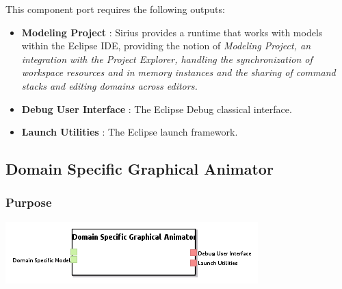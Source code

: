 \documentclass{gemoc} %
\begin{document}
This component port requires the following outputs:
\begin{itemize}
  \item \textbf{Modeling Project} :
Sirius provides a runtime that works with models within the Eclipse IDE, providing the notion of \em{Modeling Project}, an integration with the Project Explorer, handling the synchronization of workspace resources and in memory instances and the sharing of command stacks and editing domains across editors.
  \item \textbf{Debug User Interface} :
The Eclipse Debug classical interface.
  \item \textbf{Launch Utilities} :
The Eclipse launch framework.
\end{itemize}

\subsection{Domain Specific Graphical Animator}


\subsubsection{Purpose}

\begin{center}
\includegraphics*[trim=0.0cm 0.0cm 0cm 0.0cm, clip=true]{../images/generated/Generated_Domain_Specific_Graphical_Animator.png}
\end{center}
\end{document}
